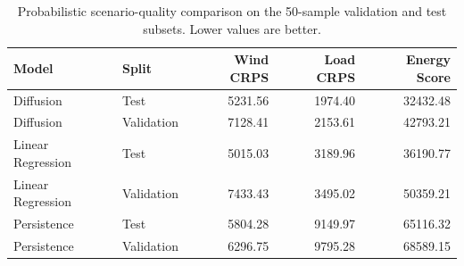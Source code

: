 \begin{table}[t]
  \centering
  \caption{Probabilistic scenario-quality comparison on the 50-sample validation and test subsets. Lower values are better.}
  \label{tab:probabilistic_metrics_comparison}
  \begin{tabular}{llrrr}
    \toprule
    \textbf{Model} & \textbf{Split} & \textbf{Wind CRPS} & \textbf{Load CRPS} & \textbf{Energy Score} \\
    \midrule
    Diffusion & Test & 5231.56 & 1974.40 & 32432.48 \\
    Diffusion & Validation & 7128.41 & 2153.61 & 42793.21 \\
    Linear Regression & Test & 5015.03 & 3189.96 & 36190.77 \\
    Linear Regression & Validation & 7433.43 & 3495.02 & 50359.21 \\
    Persistence & Test & 5804.28 & 9149.97 & 65116.32 \\
    Persistence & Validation & 6296.75 & 9795.28 & 68589.15 \\
    \bottomrule
  \end{tabular}
\end{table}
